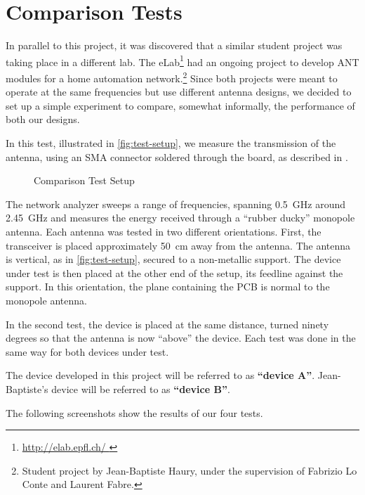 \section{Comparison Tests}

In parallel to this project, it was discovered that a similar student project
was taking place in a different lab. The eLab\footnote{ \url{
http://elab.epfl.ch/ }} had an ongoing project to develop ANT modules for a home
automation network.\footnote{Student project by Jean-Baptiste Haury, under the
supervision of Fabrizio Lo Conte and Laurent Fabre.}
Since both projects were meant to operate at the same frequencies but use
different antenna designs, we decided to set up a simple experiment to compare,
somewhat informally, the performance of both our designs. 


In this test, illustrated in \autoref{fig:test-setup}, we measure the
transmission of the antenna, using an SMA connector soldered through the board,
as described in \citep{DropoutGuide}.


\begin{figure}[htb]
  \begin{center}
  \end{center}
  \caption{Comparison Test Setup}
  \label{fig:test-setup}
\end{figure}

The network analyzer sweeps a range of frequencies, spanning \SI{0.5}{GHz}
around \SI{2.45}{GHz} and measures the energy received through a ``rubber
ducky'' monopole antenna. Each antenna was tested in two different orientations.
First, the transceiver is placed approximately \SI{50}{cm} away from the
antenna. The antenna is vertical, as in \autoref{fig:test-setup}, secured to
a non-metallic support. The device under test is then placed at the other end of
the setup, its feedline against the support. In this orientation, the plane
containing the PCB is normal to the monopole antenna.

In the second test, the device is placed at the same distance, turned
ninety degrees so
that the antenna is now ``above'' the device. Each test was done in the same way
for both devices under test.

The device developed in this project will be referred to as \textbf{``device A''}.
Jean-Baptiste's device will be referred to as \textbf{``device B''}.


The following screenshots show the results of our four tests.

